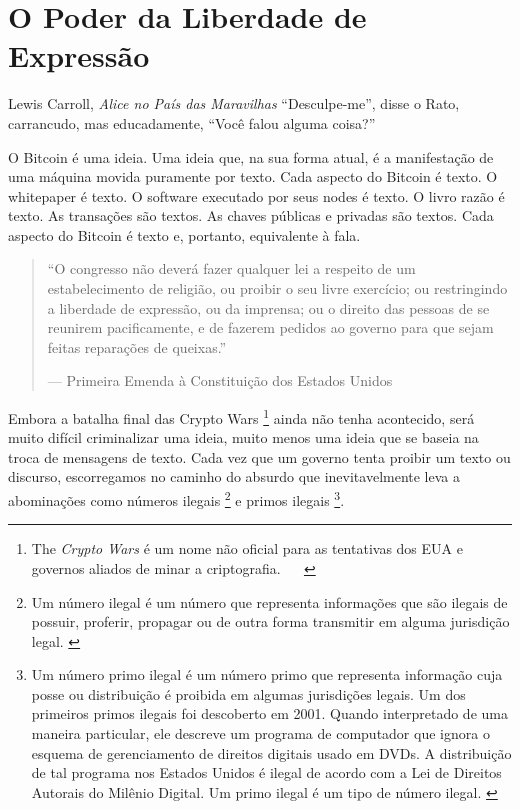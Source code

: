 \chapter{O Poder da Liberdade de Expressão}
\label{les:6}

\begin{chapquote}{Lewis Carroll, \textit{Alice no País das Maravilhas}}
\enquote{Desculpe-me}, disse o Rato, carrancudo, mas educadamente, \enquote{Você falou alguma coisa?}
\end{chapquote}

O Bitcoin é uma ideia. Uma ideia que, na sua forma atual, é a manifestação de uma máquina movida puramente por texto. Cada aspecto do Bitcoin é texto. O whitepaper é texto. O software executado por seus nodes é texto. O livro razão é texto. As transações são textos. As chaves públicas e privadas são textos. Cada aspecto do Bitcoin é texto e, portanto, equivalente à fala.

\begin{quotation}\begin{samepage}
\enquote{O congresso não deverá fazer qualquer lei a respeito de um estabelecimento de religião, ou proibir o seu livre exercício; ou restringindo a liberdade de expressão, ou da imprensa; ou o direito das pessoas de se reunirem pacificamente, e de fazerem pedidos ao governo para que sejam feitas reparações de queixas.}
\begin{flushright} --- Primeira Emenda à Constituição dos Estados Unidos
\end{flushright}\end{samepage}\end{quotation}

Embora a batalha final das Crypto Wars \footnote{The \textit{Crypto Wars} é um nome não oficial para as tentativas dos EUA e governos aliados de minar a criptografia. ~\cite{eff-cryptowars} ~\cite{wiki:cryptowars}} ainda não tenha acontecido, será muito difícil criminalizar uma ideia, muito menos uma ideia que se baseia na troca de mensagens de texto. Cada vez que um governo tenta proibir um texto ou discurso, escorregamos no caminho do absurdo que inevitavelmente leva a abominações como números ilegais \footnote{Um número ilegal é um número que representa informações que são ilegais de possuir, proferir, propagar ou de outra forma transmitir em alguma jurisdição legal. \cite{wiki:illegal-number}} e primos ilegais \footnote{Um número primo ilegal é um número primo que representa informação cuja posse ou distribuição é proibida em algumas jurisdições legais. Um dos primeiros primos ilegais foi descoberto em 2001. Quando interpretado de uma maneira particular, ele descreve um programa de computador que ignora o esquema de gerenciamento de direitos digitais usado em DVDs. A distribuição de tal programa nos Estados Unidos é ilegal de acordo com a Lei de Direitos Autorais do Milênio Digital. Um primo ilegal é um tipo de número ilegal. \cite{wiki:illegal-prime}}.

